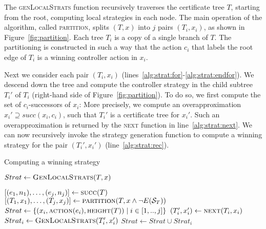 The \textsc{genLocalStrats} function recursively traverses the certificate tree $T$, starting from the root, computing local strategies in each node.  The main operation of the algorithm, called \textsc{partition}, splits $(T,x)$ into $j$ pairs $(T_i, x_i)$, as shown in Figure~\ref{fig:partition}.  Each tree $T_i$ is a copy of a single branch of $T$.  The partitioning is constructed in such a way that the action $c_i$ that labels the root edge of $T_i$ is a winning controller action in $x_i$.

Next we consider each pair $(T_i, x_i)$ (lines~\ref{alg:strat:for}-\ref{alg:strat:endfor}). We descend down the tree and compute the controller strategy in the child subtree $T_i'$ of $T_i$ (right-hand side of Figure~\ref{fig:partition}).  To do so, we first compute the set of $c_i$-successors of $x_i$: More precisely, we compute an overapproximation $x_i' \supseteq succ(x_i, c_i)$, such that $T_i'$ is a certificate tree for $x_i'$.  Such an overapproximation is returned by the \textsc{next} function in line~\ref{alg:strat:next}.  We can now recursively invoke the strategy generation function to compute a winning strategy for the pair $(T_i', x_i')$ (line~\ref{alg:strat:rec}).

\begin{algorithm}
   \caption{Computing a winning strategy}\label{alg:strat}
   \begin{algorithmic}[1]
            \State $Strat \gets \Call{GenLocalStrats}{T,x}$
            \State {}
        \EndFunction
        \Statex

            \State $[(e_1, n_1),\ldots,(e_j, n_j)] \gets \Call{succ}{T}$
            \State $[(T_1,x_1),\ldots,(T_j, x_j)] \gets \textsc{partition}(T, x \land \neg E(\mathcal{S}_T))$
            \State $Strat \gets \{(x_i, \Call{action}{e_i}, \Call{height}{T}) \mid i \in[1,..,j]\}$\label{alg:strat:strati}
            \label{alg:strat:for}
                \State $(T_i', x_i') \gets \textsc{next}(T_i, x_i)$\label{alg:strat:next}
                \State $Strat_i \gets \Call{GenLocalStrats}{T_i', x_i'}$\label{alg:strat:rec}
                \State $Strat \gets Strat \cup Strat_i$
            \EndFor\label{alg:strat:endfor}
            \State {} \label{alg:strat:return}
        \EndFunction
    \end{algorithmic}
\end{algorithm}

